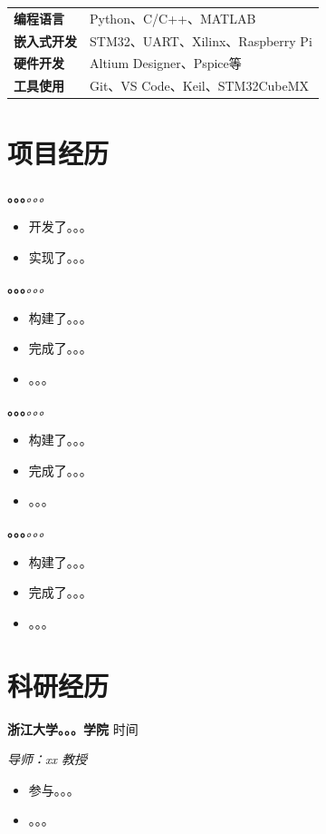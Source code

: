 \documentclass[10pt,a4paper]{article}
\newcommand{\project}[2]{%
  \vspace{3pt}%
  \noindent\textbf{#1}\hfill{\small\textit{#2}}\par
  \vspace{1pt}%
}
\newcommand{\entry}[2]{%
  \noindent\textbf{#1}\hfill{#2}\par
}
\begin{document}
\begin{tabular}{@{}p{3.2cm}@{}p{14cm}@{}}
  \textbf{编程语言}   & Python、C/C++、MATLAB \\[3pt]
  \textbf{嵌入式开发}     & STM32、UART、Xilinx、Raspberry Pi \\[3pt]
  \textbf{硬件开发}       & Altium Designer、Pspice等 \\[3pt]
  \textbf{工具使用}       & Git、VS Code、Keil、STM32CubeMX \\
\end{tabular}

\section{项目经历}

\project{\textbf{。。。}}{。。。}
\begin{itemize}
  \item 开发了。。。
  \item 实现了。。。
\end{itemize}

\project{\textbf{。。。}}{。。。}
\begin{itemize}
  \item 构建了。。。
  \item 完成了。。。
  \item 。。。
\end{itemize}

\project{\textbf{。。。}}{。。。}
\begin{itemize}
  \item 构建了。。。
  \item 完成了。。。
  \item 。。。
\end{itemize}

\project{\textbf{。。。}}{。。。}
\begin{itemize}
  \item 构建了。。。
  \item 完成了。。。
  \item 。。。
\end{itemize}

\section{科研经历}

\entry{\textbf{浙江大学。。。学院 }}{时间}
\textit{导师：xx 教授}\
\begin{itemize}
  \item 参与。。。
  \item 。。。
\end{itemize}
\end{document}
